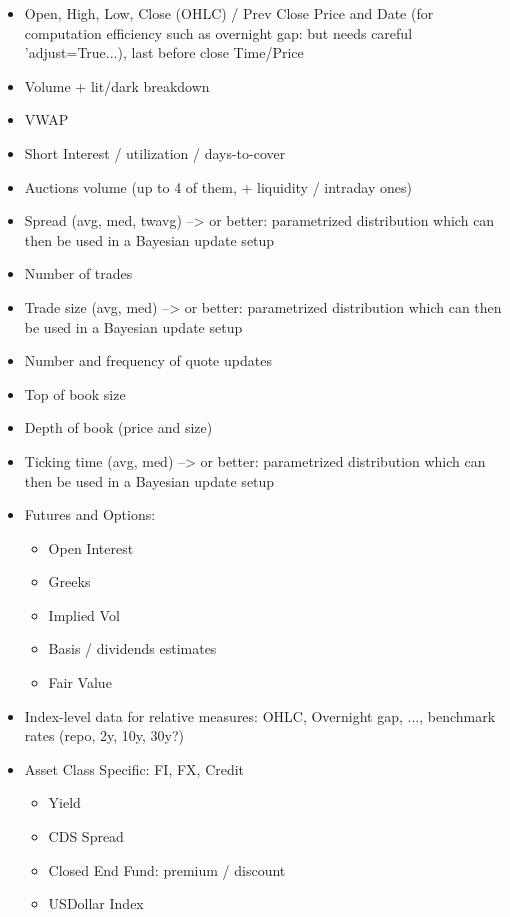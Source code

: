 \begin{itemize}
\item Open, High, Low, Close (OHLC) / Prev Close Price and Date (for computation efficiency such as overnight gap: but needs careful 'adjust=True...), last before close Time/Price
\item Volume + lit/dark breakdown
\item VWAP
\item Short Interest / utilization / days-to-cover
\item Auctions volume (up to 4 of them, + liquidity / intraday ones)
\item Spread (avg, med, twavg) --> or better: parametrized distribution which can then be used in a Bayesian update setup
\item Number of trades
\item Trade size (avg, med) --> or better: parametrized distribution which can then be used in a Bayesian update setup
\item Number and frequency of quote updates 
\item Top of book size
\item Depth of book (price and size)
\item Ticking time (avg, med) --> or better: parametrized distribution which can then be used in a Bayesian update setup
\item Futures and Options:
\begin{itemize}
\item Open Interest
\item Greeks 
\item Implied Vol
\item Basis / dividends estimates
\item Fair Value
\end{itemize}

\item Index-level data for relative measures: OHLC, Overnight gap, ..., benchmark rates (repo, 2y, 10y, 30y?)
\item Asset Class Specific: FI, FX, Credit
\begin{itemize}
\item Yield
\item CDS Spread
\item Closed End Fund: premium / discount
\item USDollar Index
\end{itemize}

\end{itemize}

